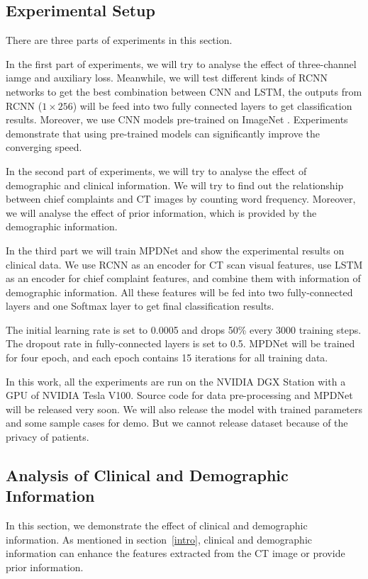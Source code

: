 \documentclass[journal]{IEEEtran}
\begin{document}
\subsection{Experimental Setup}
\label{experimentalsetup}
There are three parts of experiments in this section.

In the first part of experiments, we will try to analyse the effect of three-channel iamge and auxiliary loss. Meanwhile, we will test different kinds of RCNN networks to get the best combination between CNN and LSTM, the outputs from RCNN ($1 \times 256$) will be feed into two fully connected layers to get classification results. 
Moreover, we use CNN models pre-trained on ImageNet \cite{ILSVRC15}. Experiments demonstrate that using pre-trained models can significantly improve the converging speed.

In the second part of experiments, we will try to analyse the effect of demographic and clinical information. We will try to find out the relationship between chief complaints and CT images by counting word frequency. Moreover, we will analyse the effect of prior information, which is provided by the demographic information.

In the third part we will train MPDNet and show the experimental results on clinical data. We use RCNN as an encoder for CT scan visual features, use LSTM as an encoder for chief complaint features, and combine them with information of demographic information. All these features will be fed into two fully-connected layers and one Softmax layer to get final classification results. 

The initial learning rate is set to 0.0005 and drops 50\% every 3000 training steps. The dropout rate in fully-connected layers is set to 0.5. MPDNet will be trained for four epoch, and each epoch contains 15 iterations for all training data. 

In this work, all the experiments are run on the NVIDIA DGX Station with a GPU of NVIDIA Tesla V100. 
Source code for data pre-processing and MPDNet will be released very soon. We will also release the model with trained parameters and some sample cases for demo. But we cannot release dataset because of the privacy of patients. 

\subsection{Analysis of Clinical and Demographic Information}
\label{complaintsagegender}
In this section, we demonstrate the effect of clinical and demographic information.
As mentioned in section~\ref{intro}, clinical and demographic information can enhance the features extracted from the CT image or provide prior information. 
\end{document}
